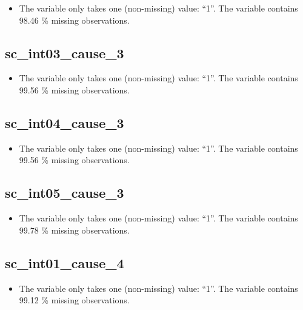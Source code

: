 \documentclass[
  letterpaper,
  DIV=11,
  numbers=noendperiod]{scrartcl}
\providecommand{\tightlist}{%
  \setlength{\itemsep}{0pt}\setlength{\parskip}{0pt}}
\begin{document}
\begin{itemize}
\tightlist
\item
  The variable only takes one (non-missing) value: ``1''. The variable
  contains 98.46 \% missing observations.
\end{itemize}

\fullline

\subsection{sc\_int03\_cause\_3}\label{sc_int03_cause_3}

\begin{itemize}
\tightlist
\item
  The variable only takes one (non-missing) value: ``1''. The variable
  contains 99.56 \% missing observations.
\end{itemize}

\fullline

\subsection{sc\_int04\_cause\_3}\label{sc_int04_cause_3}

\begin{itemize}
\tightlist
\item
  The variable only takes one (non-missing) value: ``1''. The variable
  contains 99.56 \% missing observations.
\end{itemize}

\fullline

\subsection{sc\_int05\_cause\_3}\label{sc_int05_cause_3}

\begin{itemize}
\tightlist
\item
  The variable only takes one (non-missing) value: ``1''. The variable
  contains 99.78 \% missing observations.
\end{itemize}

\fullline

\subsection{sc\_int01\_cause\_4}\label{sc_int01_cause_4}

\begin{itemize}
\tightlist
\item
  The variable only takes one (non-missing) value: ``1''. The variable
  contains 99.12 \% missing observations.
\end{itemize}
\end{document}
